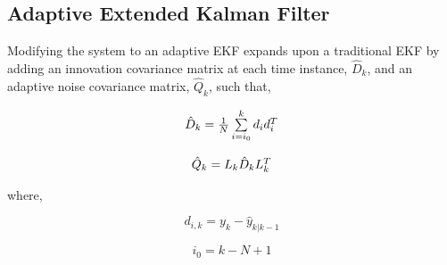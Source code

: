 \documentclass[12pt]{article}
\begin{document}
\subsection{Adaptive Extended Kalman Filter}

\par
Modifying the system to an adaptive EKF expands upon a traditional EKF by adding an innovation covariance matrix at each time instance, $\hat{D}_k$, and an adaptive noise covariance matrix, $\hat{Q}_k$, such that,

\begin{equation}
\centering
\begin{matrix}
	\hat{D}_k = \frac{1}{N}\sum\limits_{i=i_0}^{k} d_i d_i^T \\ \\ 
	\hat{Q}_k = L_k \hat{D}_k L_k^T
\end{matrix}
\end{equation}

where,

\begin{equation}
d_{i,k}= y_k - \hat{y}_{k|k-1}
\end{equation}

\begin{equation}
i_0 = k - N + 1
\end{equation}
\end{document}
